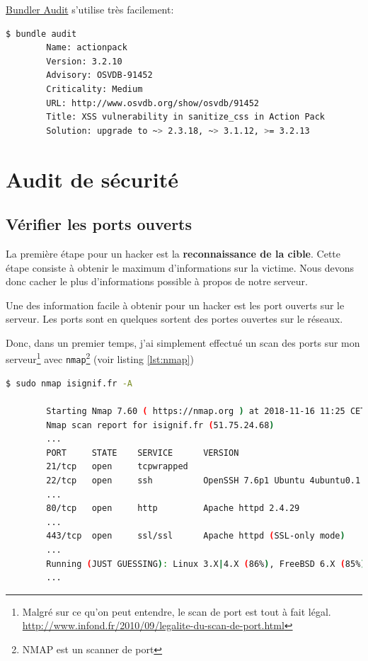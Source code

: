 \documentclass[]{report}
\begin{document}
      \href{https://github.com/rubysec/bundler-audit}{Bundler Audit} s'utilise très facilement:

      \begin{scriptsize}
        \begin{lstlisting}[language=bash]
        $ bundle audit
        Name: actionpack
        Version: 3.2.10
        Advisory: OSVDB-91452
        Criticality: Medium
        URL: http://www.osvdb.org/show/osvdb/91452
        Title: XSS vulnerability in sanitize_css in Action Pack
        Solution: upgrade to ~> 2.3.18, ~> 3.1.12, >= 3.2.13
        \end{lstlisting}
      \end{scriptsize}


  \section{Audit de sécurité}

    \subsection{Vérifier les ports ouverts}

      La première étape pour un hacker est la \textbf{reconnaissance de la cible}. Cette étape consiste à obtenir le maximum d'informations sur la victime. Nous devons donc cacher le plus d'informations possible à propos de notre serveur.

      Une des information facile à obtenir pour un hacker est les port ouverts sur le serveur. Les ports sont en quelques sortent des portes ouvertes sur le réseaux.

      Donc, dans un premier temps, j'ai simplement effectué un scan des ports sur mon serveur\footnote{Malgré sur ce qu'on peut entendre, le scan de port est tout à fait légal. \url{http://www.infond.fr/2010/09/legalite-du-scan-de-port.html}} avec \verb|nmap|\footnote{NMAP est un scanner de port} (voir listing \ref{lst:nmap})

      \begin{scriptsize}
        \begin{lstlisting}[language=bash, caption={Un san des port sur le serveur d'iSignif en novembre 2018}, label={lst:nmap}]
        $ sudo nmap isignif.fr -A

        Starting Nmap 7.60 ( https://nmap.org ) at 2018-11-16 11:25 CET
        Nmap scan report for isignif.fr (51.75.24.68)
        ...
        PORT     STATE    SERVICE      VERSION
        21/tcp   open     tcpwrapped
        22/tcp   open     ssh          OpenSSH 7.6p1 Ubuntu 4ubuntu0.1 (Ubuntu Linux; protocol 2.0)
        ...
        80/tcp   open     http         Apache httpd 2.4.29
        ...
        443/tcp  open     ssl/ssl      Apache httpd (SSL-only mode)
        ...
        Running (JUST GUESSING): Linux 3.X|4.X (86%), FreeBSD 6.X (85%)
        ...
        \end{lstlisting}
      \end{scriptsize}
\end{document}
